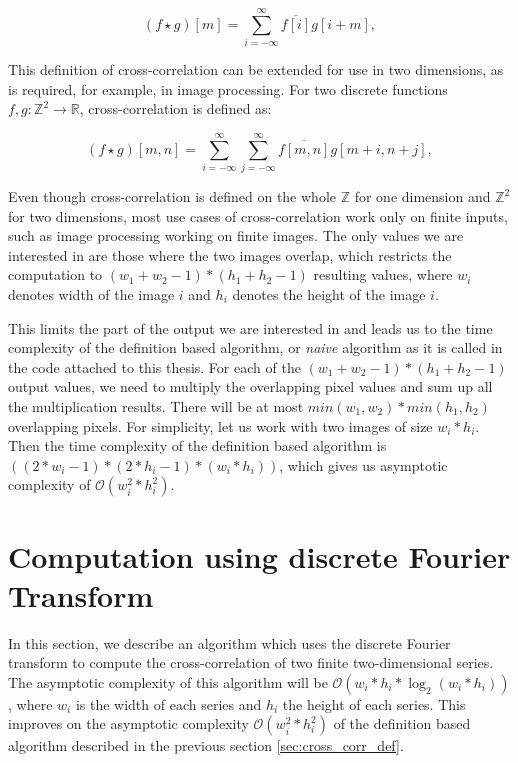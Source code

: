 \[
(f \star g)[m] = \sum_{i=-\infty}^{\infty} \overline{f[i]}g[i + m],
\] 



This definition of cross-correlation can be extended for use in two dimensions, as is required, for example, in image processing.
For two discrete functions \( f, g : \mathbb{Z}^2 \rightarrow \mathbb{R} \), cross-correlation is defined as:

\[
(f \star g)[m,n] = \sum_{i=-\infty}^{\infty} \sum_{j=-\infty}^{\infty} \overline{f[m,n]}g[m + i,n + j],
\]

Even though cross-correlation is defined on the whole $\mathbb{Z}$ for one dimension and $\mathbb{Z}^2$ for two dimensions, most use cases of cross-correlation work only on finite inputs, such as image processing working on finite images. The only values we are interested in are those where the two images overlap, which restricts the computation to $(w_1 + w_2 - 1) * (h_1 + h_2 - 1)$ resulting values, where $w_i$ denotes width of the image $i$ and $h_i$ denotes the height of the image $i$.

This limits the part of the output we are interested in and leads us to the time complexity of the definition based algorithm, or \textit{naive} algorithm as it is called in the code attached to this thesis. For each of the $(w_1 + w_2 - 1) * (h_1 + h_2 - 1)$ output values, we need to multiply the overlapping pixel values and sum up all the multiplication results. There will be at most $min(w_1, w_2) * min(h_1, h_2)$ overlapping pixels. For simplicity, let us work with two images of size $w_i*h_i$. Then the time complexity of the definition based algorithm is $((2*w_i-1)*(2 * h_i - 1) * (w_i * h_i))$, which gives us asymptotic complexity of $\mathcal{O}(w_i^2*h_i^2)$.

\section{Computation using discrete Fourier Transform}
\label{sec:cross_corr_fft}

In this section, we describe an algorithm which uses the discrete Fourier transform to compute the cross-correlation of two finite two-dimensional series. The asymptotic complexity of this algorithm will be $\mathcal{O}(w_i*h_i*\log_2(w_i*h_i))$, where $w_i$ is the width of each series and $h_i$ the height of each series. This improves on the asymptotic complexity $\mathcal{O}(w_i^2*h_i^2)$ of the definition based algorithm described in the previous section \ref{sec:cross_corr_def}.


